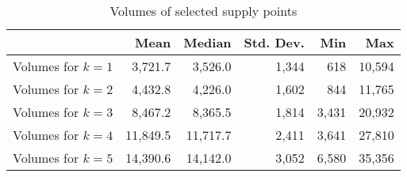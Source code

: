 \begin{table}[H]
\centering
\begin{tabular}{lrrrrr}
 & Mean  & Median  & Std. Dev.  & Min  & Max  \\  \midrule 
Volumes for $k=1$ &   3,721.7 &   3,526.0 &     1,344 &       618 &    10,594 \\  
Volumes for $k=2$ &   4,432.8 &   4,226.0 &     1,602 &       844 &    11,765 \\  
Volumes for $k=3$ &   8,467.2 &   8,365.5 &     1,814 &     3,431 &    20,932 \\  
Volumes for $k=4$ &  11,849.5 &  11,717.7 &     2,411 &     3,641 &    27,810 \\  
Volumes for $k=5$ &  14,390.6 &  14,142.0 &     3,052 &     6,580 &    35,356 \\  
\bottomrule
\end{tabular}
\caption{\label{selectedVolumesSell} Volumes of selected supply points}
\end{table}
